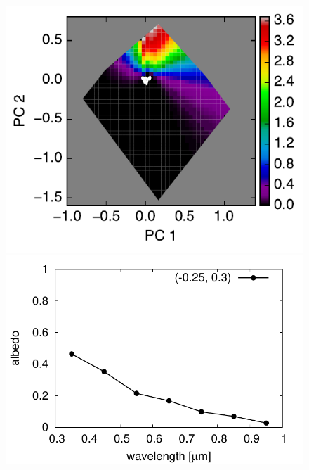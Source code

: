 \documentclass[iop,numberedappendix,apj]{emulateapj}
\begin{document}
\begin{figure}[tbh!]
\begin{minipage}{0.33\hsize}
\begin{center}
    \end{center}	
   \end{minipage}
   \begin{minipage}{0.33\hsize}
    \begin{center}
	\includegraphics[width=\hsize]{raddata_2_norm_noreg_2.pdf}
    \end{center}	
   \end{minipage}
   \begin{minipage}{0.33\hsize}
    \begin{center}
	\includegraphics[width=\hsize]{raddata_2_norm_noreg_0_sp.pdf}
    \end{center}	
   \end{minipage}

\end{figure}
\end{document}
